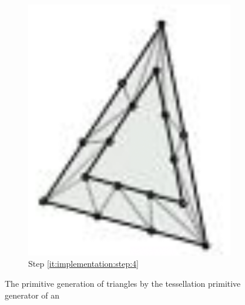 \begin{figure}
\begin{subfigure}{0.18\columnwidth}
		\includegraphics[width=\textwidth]{content/img/implementation/tessellation_4.png}
		\caption{Step \ref{it:implementation:step:4}}
		\label{fig:implementation:step:4}
	\end{subfigure}		
	\caption{The primitive generation of triangles by the tessellation primitive generator of an}
	\label{fig:implementation:step}
\end{figure}

